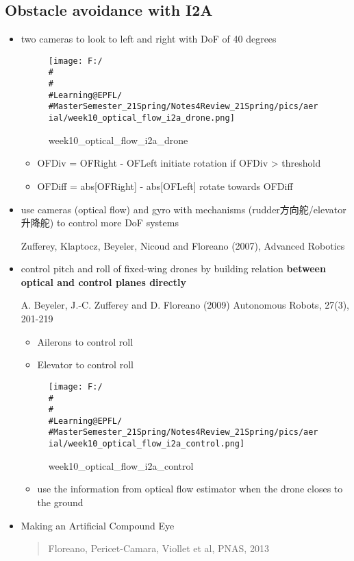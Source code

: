 \documentclass[]{article}
\begin{document}
\subsection{Obstacle avoidance with I2A}\label{header-n2445}

\begin{itemize}
\item
  two cameras to look to left and right with DoF of 40 degrees

  \begin{figure}
  \centering
  \texttt{[image: F:/\\\#\\\#\\\#Learning@EPFL/\\\#MasterSemester\_21Spring/Notes4Review\_21Spring/pics/aerial/week10\_optical\_flow\_i2a\_drone.png]}
  \caption{week10\_optical\_flow\_i2a\_drone}
  \end{figure}

  \begin{itemize}
  \item
    OFDiv = OFRight - OFLeft initiate rotation if OFDiv \textgreater{}
    threshold
  \item
    OFDiff = abs{[}OFRight{]} - abs{[}OFLeft{]} rotate towards OFDiff
  \end{itemize}
\item
  use cameras (optical flow) and gyro with mechanisms
  (rudder方向舵/elevator升降舵) to control more DoF systems

  Zufferey, Klaptocz, Beyeler, Nicoud and Floreano (2007), Advanced
  Robotics
\item
  control pitch and roll of fixed-wing drones by building relation
  \textbf{between optical and control planes directly}

  A. Beyeler, J.-C. Zufferey and D. Floreano (2009) Autonomous Robots,
  27(3), 201-219

  \begin{itemize}
  \item
    Ailerons to control roll
  \item
    Elevator to control roll
  \end{itemize}

  \begin{figure}
  \centering
  \texttt{[image: F:/\\\#\\\#\\\#Learning@EPFL/\\\#MasterSemester\_21Spring/Notes4Review\_21Spring/pics/aerial/week10\_optical\_flow\_i2a\_control.png]}
  \caption{week10\_optical\_flow\_i2a\_control}
  \end{figure}

  \begin{itemize}
  \item
    use the information from optical flow estimator when the drone
    closes to the ground
  \end{itemize}
\item
  Making an Artificial Compound Eye

  \begin{quote}
  Floreano, Pericet-Camara, Viollet et al, PNAS, 2013
  \end{quote}
\end{itemize}
\end{document}
